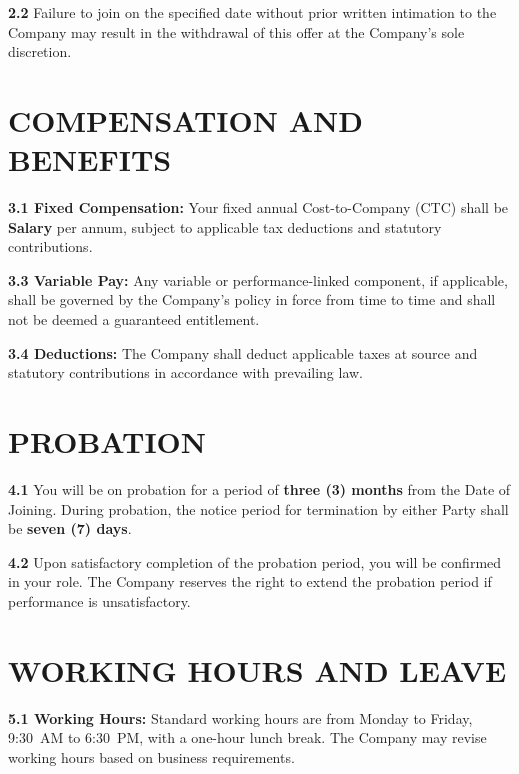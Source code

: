 \documentclass[10pt]{article}
\begin{document}
\textbf{2.2} Failure to join on the specified date without prior written intimation to the Company may result in the withdrawal of this offer at the Company's sole discretion.

\section{COMPENSATION AND BENEFITS}

\textbf{3.1 Fixed Compensation:} Your fixed annual Cost-to-Company (CTC) shall be \textbf{{{Salary}}} per annum, subject to applicable tax deductions and statutory contributions.


\textbf{3.3 Variable Pay:} Any variable or performance-linked component, if applicable, shall be governed by the Company's policy in force from time to time and shall not be deemed a guaranteed entitlement.

\textbf{3.4 Deductions:} The Company shall deduct applicable taxes at source and statutory contributions in accordance with prevailing law.

\section{PROBATION}

\textbf{4.1} You will be on probation for a period of \textbf{three (3) months} from the Date of Joining. During probation, the notice period for termination by either Party shall be \textbf{seven (7) days}.

\textbf{4.2} Upon satisfactory completion of the probation period, you will be confirmed in your role. The Company reserves the right to extend the probation period if performance is unsatisfactory.

\section{WORKING HOURS AND LEAVE}

\textbf{5.1 Working Hours:} Standard working hours are from Monday to Friday, 9:30~AM to 6:30~PM, with a one-hour lunch break. The Company may revise working hours based on business requirements.
\end{document}
